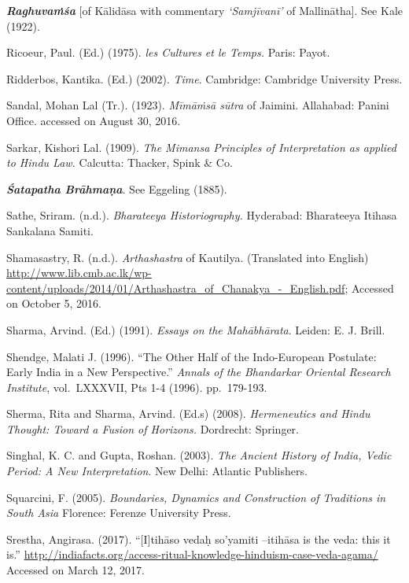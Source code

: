 \begin{thebibliography}{99}
  \textbf{\textit{Raghuvaṁśa}} [of Kālidāsa with commentary \textit{‘Samjīvanī’} of Mallinātha]. See Kale (1922).

  Ricoeur, Paul. (Ed.) (1975). \textit{les Cultures et le Temps.} Paris: Payot.

  Ridderbos, Kantika. (Ed.) (2002). \textit{Time}. Cambridge: Cambridge University Press.

  Sandal, Mohan Lal (Tr.). (1923). \textit{Mīmāṁsā sūtra} of Jaimini. Allahabad: Panini Office. accessed on August 30, 2016.

  Sarkar, Kishori Lal. (1909). \textit{The Mimansa Principles of Interpretation as applied to Hindu Law.} Calcutta: Thacker, Spink \& Co. 

  \textbf{\textit{Śatapatha Brāhmaṇa}}. See Eggeling (1885).

  Sathe, Sriram. (n.d.). \textit{Bharateeya Historiography.} Hyderabad: Bharateeya Itihasa Sankalana Samiti.

  Shamasastry, R. (n.d.). \textit{Arthashastra} of Kautilya. (Translated into English) \url{http://www.lib.cmb.ac.lk/wp-content/uploads/2014/01/Arthashastra_of_Chanakya_-_English.pdf}; Accessed on October 5, 2016.

  Sharma, Arvind. (Ed.) (1991). \textit{Essays on the Mahābhārata}. Leiden: E. J. Brill.

  Shendge, Malati J. (1996). “The Other Half of the Indo-European Postulate: Early India in a New Perspective.” \textit{Annals of the Bhandarkar Oriental Research Institute}, vol.~LXXXVII, Pts 1-4 (1996). pp.~179-193.

  Sherma, Rita and Sharma, Arvind. (Ed.s) (2008). \textit{Hermeneutics and Hindu Thought: Toward a Fusion of Horizons.} Dordrecht: Springer.

  Singhal, K. C. and Gupta, Roshan. (2003). \textit{The Ancient History of India, Vedic Period: A New Interpretation}. New Delhi: Atlantic Publishers.

  Squarcini, F. (2005). \textit{Boundaries, Dynamics and Construction of Traditions in South Asia} Florence: Ferenze University Press.

  Srestha, Angirasa. (2017). “[I]tihāso vedaḥ so’yamiti –itihāsa is the veda: this it is.” \url{http://indiafacts.org/access-ritual-knowledge-hinduism-case-veda-agama/} Accessed on March 12, 2017.


\end{thebibliography}
